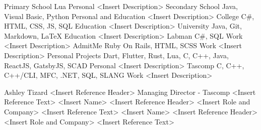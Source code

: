 \documentclass[9pt]{developercv} %
\begin{document}


\begin{entrylist}
	\entry
		{Primary School}
		{Lua}
		{Personal}
		{<Insert Description>}
	\entry
		{Secondary School}
		{Java, Visual Basic, Python}
		{Personal and Education}
		{<Insert Description>}
	\entry
		{College}
		{C\#, HTML, CSS, JS, SQL}
		{Education}
		{<Insert Description>}
	\entry
		{University}
		{Java, Git, Markdown, LaTeX}
		{Education}
		{<Insert Description>}
	\entry
		{Labman}
		{C\#, SQL}
		{Work}
		{<Insert Description>}
	\entry
		{AdmitMe}
		{Ruby On Rails, HTML, SCSS}
		{Work}
		{<Insert Description>}
	\entry
		{Personal Projects}
		{Dart, Flutter, Rust, Lua, C, C++, Java, ReactJS, GatsbyJS, SCAD}
		{Personal}
		{<Insert Description>}
	\entry
		{Tascomp}
		{C, C++, C++/CLI, MFC, .NET, SQL, SLANG}
		{Work}
		{<Insert Description>}
\end{entrylist}




\begin{entrylist}
	\entry
		{Ashley Tizard}
		{<Insert Reference Header>}
		{Managing Director - Tascomp}
		{<Insert Reference Text>}
	\entry
		{<Insert Name>}
		{<Insert Reference Header>}
		{<Insert Role and Company>}
		{<Insert Reference Text>}
	\entry
		{<Insert Name>}
		{<Insert Reference Header>}
		{<Insert Role and Company>}
		{<Insert Reference Text>}
\end{entrylist}

\end{document}
